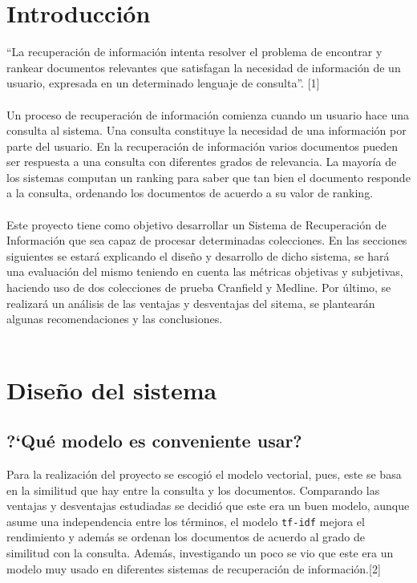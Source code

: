 \documentclass{llncs}
\begin{document}
%
\section{Introducci\'on}
%

``La recuperaci\'on de informaci\'on intenta resolver el problema de encontrar y rankear documentos relevantes que satisfagan la necesidad de informaci\'on de un usuario, expresada en un determinado lenguaje de consulta''. [1]
\\\\
Un proceso de recuperaci\'on de informaci\'on comienza cuando un usuario hace una consulta al sistema. Una consulta constituye la necesidad de una informaci\'on por parte del usuario. En la recuperaci\'on de informaci\'on varios documentos pueden ser respuesta a una consulta con diferentes grados de relevancia. La mayor\'ia de los sistemas computan un ranking para saber que tan bien el documento responde a la consulta, ordenando los documentos de acuerdo a su valor de ranking.
\\\\
Este proyecto tiene como objetivo desarrollar un Sistema de Recuperaci\'on de Informaci\'on que sea capaz de procesar determinadas colecciones. En las secciones siguientes se estar\'a explicando el dise\~no y desarrollo de dicho sistema, se har\'a una evaluaci\'on del mismo teniendo en cuenta las m\'etricas objetivas y subjetivas, haciendo uso de dos colecciones de prueba Cranfield y Medline. Por \'ultimo, se realizar\'a un an\'alisis de las ventajas y desventajas del sitema, se plantear\'an algunas recomendaciones y las conclusiones.
\\\\

%
\section{Dise\~no del sistema}
%

\subsection{?`Qu\'e modelo es conveniente usar?}
Para la realizaci\'on del proyecto se escogi\'o el modelo vectorial, pues, este se basa en la similitud que hay entre la consulta y los documentos. Comparando las ventajas y desventajas estudiadas se decidi\'o que este era un buen modelo, aunque asume una independencia entre los t\'erminos, el modelo \texttt{tf-idf} mejora el rendimiento y adem\'as se ordenan los documentos de acuerdo al grado de similitud con la consulta. Adem\'as, investigando un poco se vio que este era un modelo muy usado en diferentes sistemas de recuperaci\'on de informaci\'on.[2]\\
\end{document}
